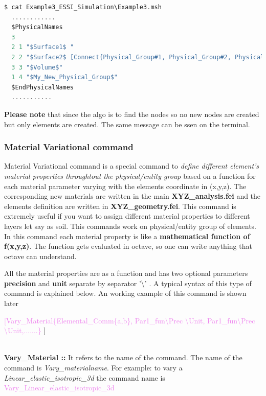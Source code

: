\documentclass[11pt]{article}
\begin{document}
\begin{lstlisting}[language=C]
$ cat Example3_ESSI_Simulation\Example3.msh
  ............
  $PhysicalNames
  3
  2 1 "$Surface1$ "
  2 2 "$Surface2$ [Connect{Physical_Group#1, Physical_Group#2, Physical_Group#3,{0\0\1}, 1, 1, find, 0.005, My_New_Physical_Group}]"
  3 3 "$Volume$"
  1 4 "$My_New_Physical_Group$"
  $EndPhysicalNames
  ...........
\end{lstlisting}

\noindent \textbf{Please note} that since the algo is to find the nodes so no new nodes
  are created but only elements are created. The same message can be ssen on
  the terminal.

\subsubsection{Material Variational command}

Material Variational command is a special command to \textit{define
different element's material properties throughtout the physical/entity group}
based on a function for each material parameter varying with the elements
coordinate in (x,y,z). The corresponding new materials are written in the main
\textbf{XYZ_analysis.fei} and the elements definition are written in
\textbf{XYZ_geometry.fei}. This command is extremely useful if you want to
assign different material properties to different layers let say as soil. This
commands work on physical/entity group of elements. In this command each
material property is like a \textbf{mathematical function of f(x,y,z)}. The
function gets evaluated in octave, so one can write anything that octave can
understand.

All the material properties are as a function and has two optional parameters
\textbf{precision} and \textbf{unit} separate by separator '\textbackslash' . A
typical syntax of this type of command is explained below. An working example
of this command is shown later \\


\centerline{\textcolor{violet}{[Vary\_Material\{Elemental\_Comm\{a,b\},
Par1_fun\textbackslash Prec \textbackslash Unit, Par1_fun\textbackslash Prec
\textbackslash Unit,.......\} }]}


\noindent \\ \textbf{Vary\_Material  ::} It refers to the name of the command. The
name of the   command   is   \textit{Vary_materialname}.   For  example:  to 
vary  a \textit{Linear\_elastic\_isotropic\_3d}      the      command     name  
is \textcolor{violet} { Vary\_Linear\_elastic\_isotropic\_3d } \\ 
\end{document}
